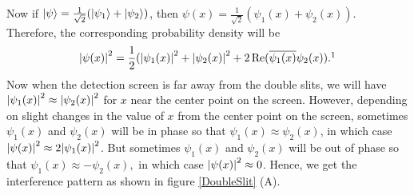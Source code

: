    Now if  $\ket{\psi}=\frac{1}{\sqrt{2}}(\ket{\psi_1}+\ket{\psi_2})$, then 
    $\psi(x)=\frac{1}{\sqrt{2}}(\psi_1(x)+\psi_2(x)).$ Therefore, the corresponding probability density will be
    \begin{equation*}\abs{\psi(x)}^2=\frac{1}{2}(\abs{\psi_1(x)}^2+\abs{\psi_2(x)}^2+2\Re(\overline{\psi_1(x)}\psi_2(x)).\protect\footnotemark
    \end{equation*}
    Now when the detection screen is far away from the double slits, we will have $\abs{\psi_1(x)}^2\approx \abs{\psi_2(x)}^2$ for $x$ near the center point on the screen. However, depending on slight changes in the value of $x$ from the center point on the screen, sometimes $\psi_1(x)$ and $\psi_2(x)$ will be in phase so that  $\psi_1(x)\approx\psi_2(x)$, in which case $\abs{\psi(x)}^2\approx 2\abs{\psi_1(x)}^2$. But sometimes $\psi_1(x)$ and $\psi_2(x)$ will be  out of phase so that $\psi_1(x)\approx-\psi_2(x),$ in which case $\abs{\psi(x)}^2\approx 0$. Hence, we get the interference pattern as shown in figure \ref{DoubleSlit} (A).
    
